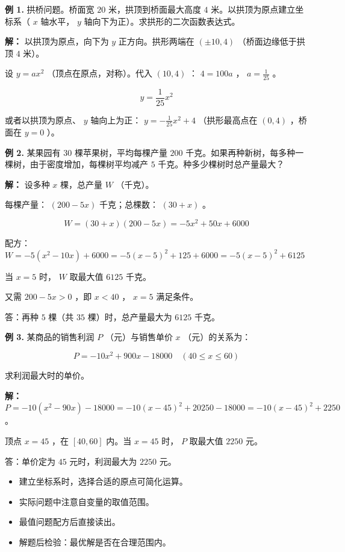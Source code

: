 \begin{workedexamples}


\textbf{例 1.} 拱桥问题。桥面宽 $20$ 米，拱顶到桥面最大高度 $4$ 米。以拱顶为原点建立坐标系（ $x$ 轴水平， $y$ 轴向下为正）。求拱形的二次函数表达式。

\textbf{解：} 以拱顶为原点，向下为 $y$ 正方向。拱形两端在 $(\pm 10, 4)$ （桥面边缘低于拱顶 $4$ 米）。

设 $y = ax^2$ （顶点在原点，对称）。代入 $(10, 4)$ ： $4 = 100a$ ， $a = \frac{1}{25}$ 。

\[
y = \frac{1}{25}x^2
\]


或者以拱顶为原点、 $y$ 轴向上为正： $y = -\frac{1}{25}x^2 + 4$ （拱形最高点在 $(0, 4)$ ，桥面在 $y = 0$ ）。

\textbf{例 2.} 某果园有 $30$ 棵苹果树，平均每棵产量 $200$ 千克。如果再种新树，每多种一棵树，由于密度增加，每棵树平均减产 $5$ 千克。种多少棵树时总产量最大？

\textbf{解：} 设多种 $x$ 棵，总产量 $W$ （千克）。

每棵产量： $(200 - 5x)$ 千克；总棵数： $(30 + x)$ 。

\[
W = (30 + x)(200 - 5x) = -5x^2 + 50x + 6000
\]


配方： $W = -5(x^2 - 10x) + 6000 = -5(x - 5)^2 + 125 + 6000 = -5(x - 5)^2 + 6125$

当 $x = 5$ 时， $W$ 取最大值 $6125$ 千克。

又需 $200 - 5x > 0$ ，即 $x < 40$ ， $x = 5$ 满足条件。

答：再种 $5$ 棵（共 $35$ 棵）时，总产量最大为 $6125$ 千克。

\textbf{例 3.} 某商品的销售利润 $P$ （元）与销售单价 $x$ （元）的关系为：

\[
P = -10x^2 + 900x - 18000 \quad (40 \leq x \leq 60)
\]


求利润最大时的单价。

\textbf{解：} $P = -10(x^2 - 90x) - 18000 = -10(x - 45)^2 + 20250 - 18000 = -10(x - 45)^2 + 2250$ 。

顶点 $x = 45$ ，在 $[40, 60]$ 内。当 $x = 45$ 时， $P$ 取最大值 $2250$ 元。

答：单价定为 $45$ 元时，利润最大为 $2250$ 元。

\end{workedexamples}

\begin{keytakeaway}


\begin{itemize}
  \item 建立坐标系时，选择合适的原点可简化运算。
  \item 实际问题中注意自变量的取值范围。
  \item 最值问题配方后直接读出。
  \item 解题后检验：最优解是否在合理范围内。
\end{itemize}


\end{keytakeaway}

